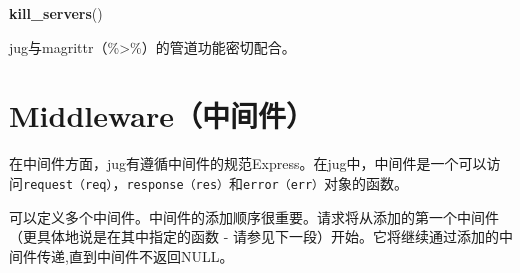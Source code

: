 \documentclass[]{book}
\newenvironment{Shaded}{\begin{snugshade}}{\end{snugshade}}
\newcommand{\KeywordTok}[1]{\textcolor[rgb]{0.13,0.29,0.53}{\textbf{#1}}}
\newcommand{\DataTypeTok}[1]{\textcolor[rgb]{0.13,0.29,0.53}{#1}}
\newcommand{\DecValTok}[1]{\textcolor[rgb]{0.00,0.00,0.81}{#1}}
\newcommand{\StringTok}[1]{\textcolor[rgb]{0.31,0.60,0.02}{#1}}
\newcommand{\CommentTok}[1]{\textcolor[rgb]{0.56,0.35,0.01}{\textit{#1}}}
\newcommand{\ControlFlowTok}[1]{\textcolor[rgb]{0.13,0.29,0.53}{\textbf{#1}}}
\newcommand{\OperatorTok}[1]{\textcolor[rgb]{0.81,0.36,0.00}{\textbf{#1}}}
\newcommand{\NormalTok}[1]{#1}
\begin{document}
\begin{Shaded}
\end{Shaded}

\begin{Shaded}
\end{Shaded}

\begin{Shaded}
\begin{Highlighting}[]
\KeywordTok{kill_servers}\NormalTok{()}
\end{Highlighting}
\end{Shaded}

jug与magrittr（\%\textgreater{}\%）的管道功能密切配合。

\section{Middleware（中间件）}\label{middleware}

在中间件方面，jug有遵循中间件的规范Express。在jug中，中间件是一个可以访问\texttt{request（req）}，\texttt{response（res）}和\texttt{error（err）}对象的函数。

可以定义多个中间件。中间件的添加顺序很重要。请求将从添加的第一个中间件（更具体地说是在其中指定的函数
-
请参见下一段）开始。它将继续通过添加的中间件传递,直到中间件不返回NULL。
\end{document}
